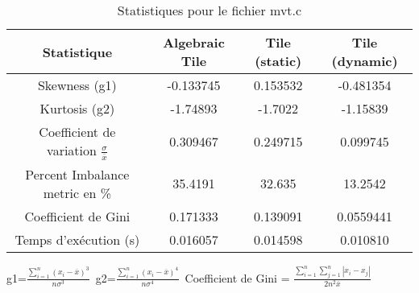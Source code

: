 \documentclass{article}
\begin{document}
\begin{table}[htbp]
  \centering
  \caption{Statistiques pour le fichier mvt.c}
  \begin{tabular}{|c|c|c|c|}
    \hline
    Statistique & Algebraic Tile & Tile (static) & Tile (dynamic) \\ 
    \hline
    Skewness (g1)  & -0.133745 & 0.153532 & -0.481354 \\ 
    Kurtosis (g2)  & -1.74893 & -1.7022 & -1.15839 \\ 
    Coefficient de variation $ \frac{\sigma}{\overline{x}} $ & 0.309467 & 0.249715 & 0.099745\\ 
    Percent Imbalance metric en \% & 35.4191 & 32.635 & 13.2542\\ 
    Coefficient de Gini  & 0.171333 & 0.139091 & 0.0559441\\ 
    Temps d'exécution (s) &  0.016057    &  0.014598   &  0.010810   \\ 

    \hline
  \end{tabular}
\end{table}
g1=$ \frac{\sum_{i=1}^{n} (x_i - \overline{x})^3}{n\sigma^3} $\
g2=$ \frac{\sum_{i=1}^{n} (x_i - \overline{x})^4}{n\sigma^4} $\
Coefficient de Gini = $ \frac{\sum_{i=1}^{n}\sum_{j=1}^{n} |x_i - x_j|}{2n^2\overline{x}} $\
\newpage
\end{document}
